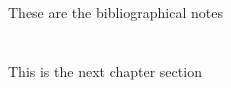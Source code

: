 These are the bibliographical notes
\citep{ldesc2e}

\medskip



\section*{\ProximoCapitulo}
\TocProximoCapitulo

This is the next chapter section

